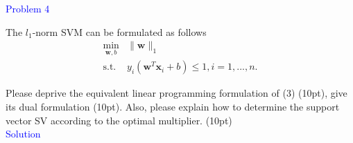 \textcolor{blue}{Problem 4}
\par The $l_1$-norm SVM can be formulated as follows
    \begin{equation}
       \begin{aligned}
        \min_{\mathbf{w},b} & \|\mathbf{w}\|_1 \\
        \text{s.t. }& y_i(\mathbf{w}^T\mathbf{x}_i+b)\leq 1,i=1,...,n.
    \end{aligned}     
    \end{equation}

\par Please deprive the equivalent linear programming formulation of (3) (10pt), give its dual formulation (10pt). Also, please explain how to determine the support vector SV according to the optimal multiplier. (10pt) \\
\textcolor{blue}{Solution}















